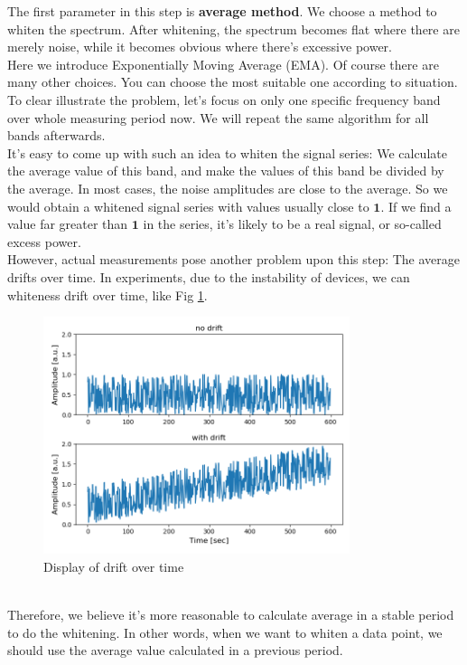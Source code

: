 \documentclass[
12pt, %
a4paper %
]{extreport}
\theoremstyle{plain}
\begin{document}
\begin{enumerate}
The first parameter in this step is \textbf{average method}. We choose a method to whiten the spectrum. After whitening, the spectrum becomes flat where there are merely noise, while it becomes obvious where there's excessive power. \\
Here we introduce Exponentially Moving Average (EMA). Of course there are many other choices. You can choose the most suitable one according to situation. \\
To clear illustrate the problem, let's focus on only one specific frequency band over whole measuring period now. We will repeat the same algorithm for all bands afterwards. \\
It's easy to come up with such an idea to whiten the signal series: We calculate the average value of this band, and make the values of this band be divided by the average. In most cases, the noise amplitudes are close to the average. So we would obtain a whitened signal series with values usually close to $\textbf{1}$. If we find a value far greater than $\textbf{1}$ in the series, it's likely to be a real signal, or so-called excess power. \\
However, actual measurements pose another problem upon this step: The average drifts over time. In experiments, due to the instability of devices, we can whiteness drift over time, like Fig \ref{fig:drift}. 
\begin{figure}[ht]
	\centering
	\includegraphics[width=0.8\textwidth]{drift.png}
	\caption{Display of drift over time}
	\label{fig:drift}
\end{figure}\\
Therefore, we believe it's more reasonable to calculate average in a stable period to do the whitening. In other words, when we want to whiten a data point, we should use the average value calculated in a previous period. \\

\end{enumerate}
\end{document}
